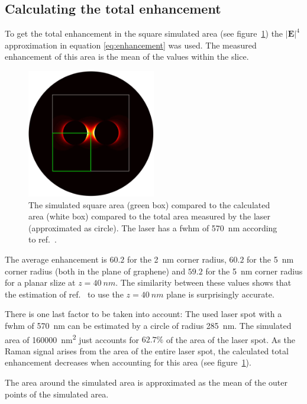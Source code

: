 \subsection{Calculating the total enhancement}

To get the total enhancement in the square simulated area (see figure~\ref{fig:symmetry}) the $\mathbf{|E|}^4$ approximation in equation \ref{eq:enhancement} was used. The measured enhancement of this area is the mean of the values within the slice.

\begin{figure}[!h]
  \centering
  \includegraphics[width=0.5\textwidth]{./images/fwhm-chart.jpg}
  \caption{The simulated square area (green box) compared to the calculated area (white box) compared to the total area measured by the laser (approximated as circle). The laser has a fwhm of \SI{570}{nm} according to ref.~\cite{heeg}.}
  \label{fig:symmetry}
\end{figure}

The average enhancement is $60.2$ for the \SI{2}{nm} corner radius, $60.2$ for the \SI{5}{nm} corner radius (both in the plane of graphene) and $59.2$ for the \SI{5}{nm} corner radius for a planar slize at $z=\SI{40}{nm}$. The similarity between these values shows that the estimation of ref.~\cite{heeg} to use the $z=\SI{40}{nm}$ plane is surprisingly accurate.

There is one last factor to be taken into account: The used laser spot with a fwhm of \SI{570}{nm} can be estimated by a circle of radius \SI{285}{nm}. The simulated area of \SI{160 000}{nm^2} just accounts for $62.7\%$ of the area of the laser spot. As the Raman signal arises from the area of the entire laser spot, the calculated total enhancement decreases when accounting for this area (see figure~\ref{fig:symmetry}).

The area around the simulated area is approximated as the mean of the outer points of the simulated area.


